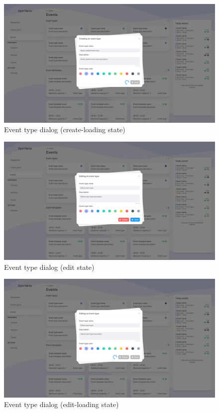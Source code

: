 \documentclass[a4paper, 12pt, oneside]{book}
\begin{document}
\begin{figure}[H]
	\centering
	\includegraphics[width=\textwidth]{assets/ui/EventTypeCreateLoading.png}
	\caption{Event type dialog (create-loading state)}
\end{figure}
\begin{figure}[H]
	\centering
	\includegraphics[width=\textwidth]{assets/ui/EventTypeEdit.png}
	\caption{Event type dialog (edit state)}
\end{figure}
\begin{figure}[H]
	\centering
	\includegraphics[width=\textwidth]{assets/ui/EventTypeEditLoading.png}
	\caption{Event type dialog (edit-loading state)}
\end{figure}
\end{document}
